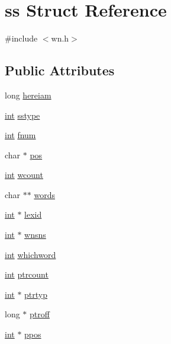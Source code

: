 \hypertarget{structss}{}\section{ss Struct Reference}
\label{structss}


{\ttfamily \#include $<$wn.\+h$>$}

\subsection*{Public Attributes}
\begin{DoxyCompactItemize}
\item 
long \hyperlink{structss_a2735ebc4a2255ac0d93388829bdfc3e4}{hereiam}
\item 
\hyperlink{tk_8h_a83f82f76e7fed06f4c49d2db94028a6d}{int} \hyperlink{structss_a09a53c62d97f07f71e903e9bf20e0569}{sstype}
\item 
\hyperlink{tk_8h_a83f82f76e7fed06f4c49d2db94028a6d}{int} \hyperlink{structss_a90ef575bd4857f1a855fec8afa06133d}{fnum}
\item 
char $\ast$ \hyperlink{structss_a5c620e134818e530561609b3a70855d8}{pos}
\item 
\hyperlink{tk_8h_a83f82f76e7fed06f4c49d2db94028a6d}{int} \hyperlink{structss_af6d56eee3ae23982feaf061a4bc744aa}{wcount}
\item 
char $\ast$$\ast$ \hyperlink{structss_acf11f446ef714859a43663592ca69011}{words}
\item 
\hyperlink{tk_8h_a83f82f76e7fed06f4c49d2db94028a6d}{int} $\ast$ \hyperlink{structss_a67bc5dcd90d3bd4199ea6a9bc2ad5ba9}{lexid}
\item 
\hyperlink{tk_8h_a83f82f76e7fed06f4c49d2db94028a6d}{int} $\ast$ \hyperlink{structss_afb132c5c6332a6eb070e8bf4f596d95e}{wnsns}
\item 
\hyperlink{tk_8h_a83f82f76e7fed06f4c49d2db94028a6d}{int} \hyperlink{structss_a64c10e3319c3941af3dfa93d688a61ee}{whichword}
\item 
\hyperlink{tk_8h_a83f82f76e7fed06f4c49d2db94028a6d}{int} \hyperlink{structss_a94c55d4ba20fb71ec9a15c3cad5908c3}{ptrcount}
\item 
\hyperlink{tk_8h_a83f82f76e7fed06f4c49d2db94028a6d}{int} $\ast$ \hyperlink{structss_a28a64f32ffb2270b47e8b081cf126f86}{ptrtyp}
\item 
long $\ast$ \hyperlink{structss_abeec9f8e331d6d5044a0f419795b7617}{ptroff}
\item 
\hyperlink{tk_8h_a83f82f76e7fed06f4c49d2db94028a6d}{int} $\ast$ \hyperlink{structss_a24e3dd6d00615d5b6d667bc0fd8ebc5d}{ppos}
$$
\end{DoxyCompactItemize}
